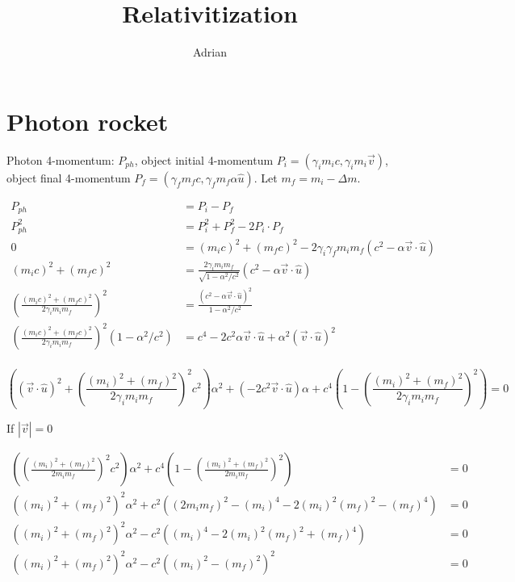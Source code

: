 \documentclass[12pt, letterpaper]{article}
\title{Relativitization}
\author{Adrian}
\begin{document}
    \begin{titlepage}
        \maketitle
    \end{titlepage}


    \section{Photon rocket}\label{sec:photon-rocket}

    Photon 4-momentum: $P_{ph}$, object initial 4-momentum $P_i = (\gamma_i m_i c, \gamma_i m_i \overrightarrow{v}) $,
    object final 4-momentum $P_f = (\gamma_f m_f c, \gamma_f m_f \alpha \hat{u})$. Let $m_f = m_i - \Delta m$.

    \begin{align*}
        P_{ph} &= P_i - P_f \\
        P_{ph}^2 &= P_i^2 + P_f^2 - 2 P_i \cdot P_f \\
        0 &= (m_i c)^2 + (m_f c)^2 - 2 \gamma_i \gamma_f m_i m_f ( c^2 - \alpha \overrightarrow{v} \cdot \hat{u}) \\
        (m_i c)^2 + (m_f c)^2 &= \frac{2 \gamma_i m_i m_f}{\sqrt{1 - \alpha^2 / c^2}} ( c^2 - \alpha \overrightarrow{v} \cdot \hat{u}) \\
        \left(\frac{(m_i c)^2 + (m_f c)^2}{2 \gamma_i m_i m_f}\right)^2 &= \frac{(c^2 - \alpha \overrightarrow{v} \cdot \hat{u})^2}{1 - \alpha^2 / c^2} \\
        \left(\frac{(m_i c)^2 + (m_f c)^2}{2 \gamma_i m_i m_f}\right)^2 (1 - \alpha^2 / c^2) &= c^4 - 2 c^2 \alpha \overrightarrow{v} \cdot \hat{u} + \alpha^2 (\overrightarrow{v} \cdot \hat{u})^2 \\
    \end{align*}

    \begin{equation*}
        ((\overrightarrow{v} \cdot \hat{u})^2 + \left(\frac{(m_i)^2 + (m_f)^2}{2 \gamma_i m_i m_f}\right)^2 c^2) \alpha ^2 + (- 2 c^2 \overrightarrow{v} \cdot \hat{u}) \alpha + c^4 \left(1 - \left(\frac{(m_i)^2 + (m_f)^2}{2 \gamma_i m_i m_f}\right)^2 \right) = 0
    \end{equation*}

    If $|\overrightarrow{v}| = 0$

    \begin{align*}
    (\left(\frac{(m_i)^2 + (m_f)^2}{2 m_i m_f}\right)^2 c^2)
        \alpha^2 + c^4 \left(1 - \left(\frac{(m_i)^2 + (m_f)^2}{2 m_i m_f}\right)^2 \right) &= 0 \\
        ((m_i)^2 + (m_f)^2)^2 \alpha^2 + c^2 ((2 m_i m_f)^2 - (m_i)^4 - 2 (m_i)^2 (m_f)^2 - (m_f)^4) &= 0 \\
        ((m_i)^2 + (m_f)^2)^2 \alpha^2 - c^2 ((m_i)^4 - 2 (m_i)^2 (m_f)^2 + (m_f)^4) &= 0 \\
        ((m_i)^2 + (m_f)^2)^2 \alpha^2 - c^2 ((m_i)^2 - (m_f)^2)^2 &= 0
    \end{align*}
\end{document}
